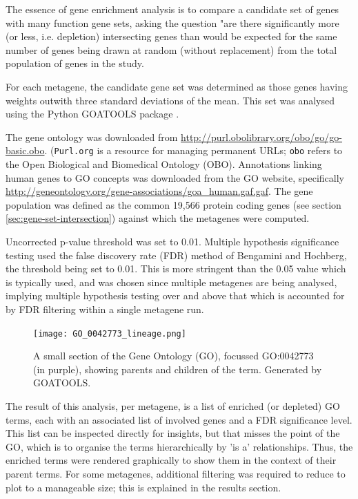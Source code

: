 \documentclass[draft, tikz, 12pt,a4paper,oneside,fleqn]{article}
\begin{document}
The essence of gene enrichment analysis is to compare a candidate set of genes with many function gene sets, asking the question "are there significantly more (or less, i.e. depletion) intersecting genes than would be expected for the same number of genes being drawn at random (without replacement) from the total population of genes in the study. 

For each metagene, the candidate gene set was determined as those genes having weights outwith three standard deviations of the mean.   This set was analysed using the Python GOATOOLS package \cite{GOATOOLS}.   

The gene ontology was downloaded from \url{http://purl.obolibrary.org/obo/go/go-basic.obo}.  ({\tt Purl.org} is a resource for managing permanent URLs; {\tt obo} refers to the Open Biological and Biomedical Ontology (OBO).  
Annotations linking human genes to GO concepts was downloaded from the GO website, specifically \url{http://geneontology.org/gene-associations/goa_human.gaf.gaf}.   
The gene population was defined as the common 19,566 protein coding genes (see section \ref{sec:gene-set-intersection}) against which the metagenes were computed.  

Uncorrected p-value threshold was set to 0.01.
Multiple hypothesis significance testing used the false discovery rate (FDR) method of Bengamini and Hochberg, the threshold being set to 0.01.  This is more stringent than the 0.05 value which is typically used, and was chosen since multiple metagenes are being analysed, implying multiple hypothesis testing over and above that which is accounted for by FDR filtering within a single metagene run.

\begin{figure}[ht]
\begin{center}
\texttt{[image: GO\_0042773\_lineage.png]}
\caption{A small section of the Gene Ontology (GO), focussed GO:0042773 (in purple), showing parents and children of the term.   Generated by GOATOOLS.}
\label{fig:eg_go_graphic}
\end{center}
\end{figure}

The result of this analysis, per metagene, is a list of enriched (or depleted) GO terms, each with an associated list of involved genes and a FDR significance level.   This list can be inspected directly for insights, but that misses the point of the GO, which is to organise the terms hierarchically by 'is a' relationships.   Thus, the enriched terms were rendered graphically to show them in the context of their parent terms.   For some metagenes, additional filtering was required to reduce to plot to a manageable size; this is explained in the results section.
\end{document}
